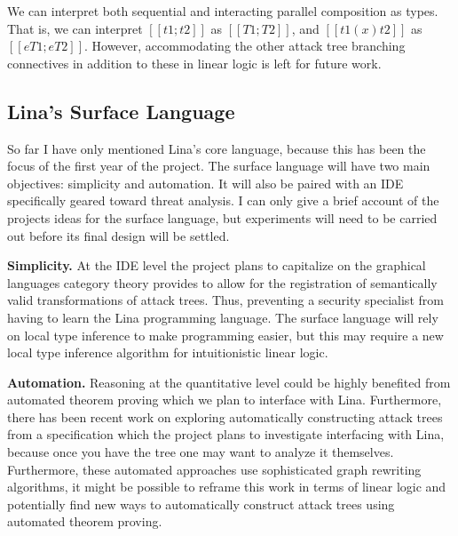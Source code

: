 We can interpret both sequential and interacting parallel composition
as types.  That is, we can interpret $[[t1 ; t2]]$ as $[[T1 ; T2]]$,
and $[[t1 (x) t2]]$ as $[[e T1 ; e T2]]$.  However, accommodating the
other attack tree branching connectives in addition to these in linear
logic is left for future work.

\subsection{Lina's Surface Language}
\label{subsec:linas_surface_language}

So far I have only mentioned Lina's core language, because this has
been the focus of the first year of the project.  The surface language
will have two main objectives: simplicity and automation.  It will
also be paired with an IDE specifically geared toward threat analysis.
I can only give a brief account of the projects ideas for the surface
language, but experiments will need to be carried out before its
final design will be settled.

\textbf{Simplicity.}  At the IDE level the project plans to capitalize
on the graphical languages category theory provides
\cite{Selinger:2009} to allow for the registration of semantically
valid transformations of attack trees.  Thus, preventing a security
specialist from having to learn the Lina programming language.  The
surface language will rely on local type inference to make programming
easier, but this may require a new local type inference algorithm for
intuitionistic linear logic.

\textbf{Automation.}  Reasoning at the quantitative level could be
highly benefited from automated theorem proving which we plan to
interface with Lina.  Furthermore, there has been recent work
\cite{essay69399,Sheyner:2002:AGA:829514.830526,6957121,essay69402} on
exploring automatically constructing attack trees from a specification
which the project plans to investigate interfacing with Lina, because
once you have the tree one may want to analyze it themselves.
Furthermore, these automated approaches use sophisticated graph
rewriting algorithms, it might be possible to reframe this work in
terms of linear logic and potentially find new ways to automatically
construct attack trees using automated theorem proving.

